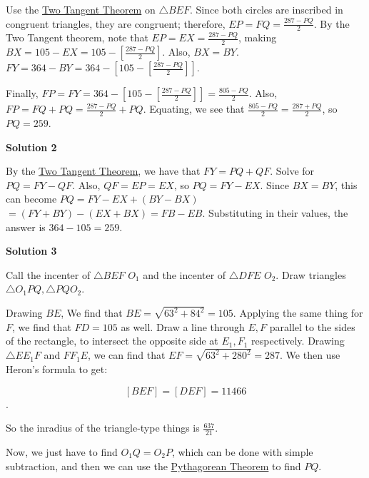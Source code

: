 \begin{enumerate}
 Use the \href{https://artofproblemsolving.com/wiki/index.php?title=Two\_Tangent\_Theorem}{Two Tangent Theorem} on $\triangle BEF$. Since both circles are inscribed in congruent triangles, they are congruent; therefore, $EP = FQ = \frac{287 - PQ}{2}$. By the Two Tangent theorem, note that $EP = EX = \frac{287 - PQ}{2}$, making $BX = 105 - EX = 105 - \left[\frac{287 - PQ}{2}\right]$. Also, $BX = BY$. $FY = 364 - BY = 364 - \left[105 - \left[\frac{287 - PQ}{2}\right]\right]$. 

 Finally, $FP = FY = 364 - \left[105 - \left[\frac{287 - PQ}{2}\right]\right] = \frac{805 - PQ}{2}$. Also, $FP = FQ + PQ = \frac{287 - PQ}{2} + PQ$. Equating, we see that $\frac{805 - PQ}{2} = \frac{287 + PQ}{2}$, so $PQ = \boxed{259}$.

 



\textbf{Solution 2}

By the \href{https://artofproblemsolving.com/wiki/index.php?title=Two\_Tangent\_Theorem}{Two Tangent Theorem}, we have that $FY = PQ + QF$. Solve for $PQ = FY - QF$. Also, $QF = EP = EX$, so $PQ = FY - EX$. Since $BX = BY$, this can become $PQ = FY - EX + (BY - BX)$$= \left(FY + BY\right) - \left(EX + BX\right) = FB - EB$. Substituting in their values, the answer is $364 - 105 = 259$.

 



\textbf{Solution 3}

Call the incenter of $\triangle BEF$ $O_1$ and the incenter of $\triangle DFE$ $O_2$. Draw triangles $\triangle O_1PQ,\triangle PQO_2$.

 Drawing $BE$, We find that $BE = \sqrt {63^2 + 84^2} = 105$. Applying the same thing for $F$, we find that $FD = 105$ as well. Draw a line through $E,F$ parallel to the sides of the rectangle, to intersect the opposite side at $E_1,F_1$ respectively. Drawing $\triangle EE_1F$ and $FF_1E$, we can find that $EF = \sqrt {63^2 + 280^2} = 287$. We then use Heron's formula to get:

 
 \[[BEF] = [DEF] = 11 466\].

 So the inradius of the triangle-type things is $\frac {637}{21}$.

 Now, we just have to find $O_1Q = O_2P$, which can be done with simple subtraction, and then we can use the \href{https://artofproblemsolving.com/wiki/index.php?title=Pythagorean\_Theorem}{Pythagorean Theorem} to find $PQ$. 

 




\end{enumerate}
